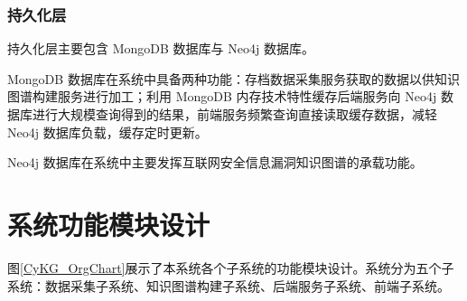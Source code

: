 \documentclass[a4paper,AutoFakeBold,oneside,12pt]{book}
\begin{document}
\subsubsection{持久化层}

持久化层主要包含 MongoDB 数据库与 Neo4j 数据库。

MongoDB 数据库在系统中具备两种功能：存档数据采集服务获取的数据以供知识图谱构建服务进行加工；利用 MongoDB 内存技术特性缓存后端服务向 Neo4j 数据库进行大规模查询得到的结果，前端服务频繁查询直接读取缓存数据，减轻 Neo4j 数据库负载，缓存定时更新。

Neo4j 数据库在系统中主要发挥互联网安全信息漏洞知识图谱的承载功能。

\section{系统功能模块设计}

图\ref{CyKG_OrgChart}展示了本系统各个子系统的功能模块设计。系统分为五个子系统：数据采集子系统、知识图谱构建子系统、后端服务子系统、前端子系统。
\end{document}
